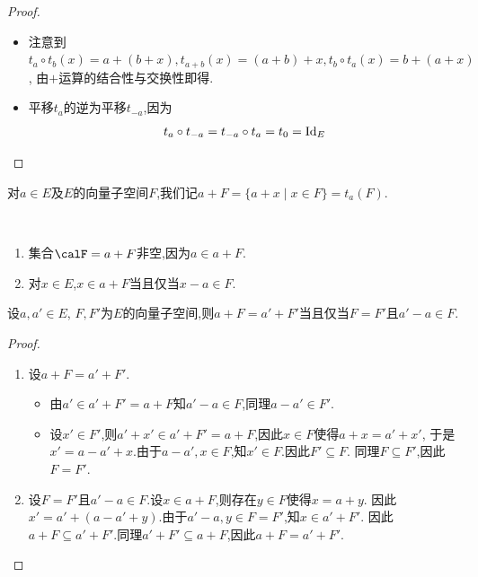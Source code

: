 \begin{proof} $\ $
    \begin{itemize}
        \item 注意到$t_a \circ t_b(x) = a + (b + x), t_{a + b}(x) = (a + b) + x, t_b \circ t_a(x) = b + (a + x)$,
            由$+$运算的结合性与交换性即得.
        \item 平移$t_a$的逆为平移$t_{-a}$,因为\[ t_a \circ t_{-a} = t_{-a} \circ t_a = t_0 = \operatorname{Id}_E \]
    \end{itemize}
\end{proof}

\begin{rqq}
    对$a \in E$及$E$的向量子空间$F$,我们记$a + F = \{ a + x \mid x \in F \} = t_a(F)$.
\end{rqq}

\begin{rqq} $\ $
    \begin{enumerate}
        \item 集合$\calF = a + F$非空,因为$a \in a + F$.
        \item 对$x \in E$,$x \in a + F$当且仅当$x - a \in F$.
    \end{enumerate}
\end{rqq}

\begin{lem}
    设$a, a' \in E$, $F, F'$为$E$的向量子空间,则$a + F = a' + F'$当且仅当$F = F'$且$a' - a \in F$.
\end{lem}

\begin{proof} $\ $
    \begin{enumerate}
        \item 设$a + F = a' + F'$.
            \begin{itemize}
                \item 由$a' \in a' + F' = a + F$知$a' - a \in F$,同理$a -  a' \in F'$.
                \item 设$x' \in F'$,则$a' + x' \in a' + F' = a + F$,因此$x \in F$使得$a + x = a' + x'$,
                    于是$x' = a - a' + x$.由于$a - a', x \in F$,知$x' \in F$.因此$F' \subseteq F$.
                    同理$F \subseteq F'$,因此$F = F'$.
            \end{itemize}
        \item 设$F = F'$且$a' - a \in F$.设$x \in a + F$,则存在$y \in F$使得$x = a + y$.
            因此$x' = a' + (a - a' + y)$.由于$a' - a, y \in F = F'$,知$x \in a' + F'$.
            因此$a + F \subseteq a' + F'$.同理$a' + F' \subseteq a + F$,因此$a + F = a' + F'$. \qedhere
    \end{enumerate}
\end{proof}

